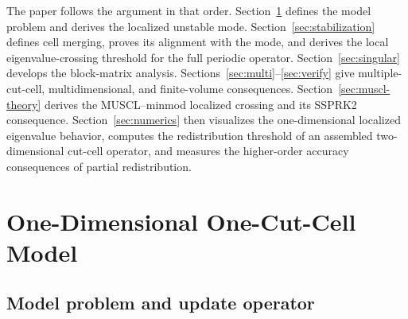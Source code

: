 \documentclass[preprint,12pt]{elsarticle}
\begin{document}
The paper follows the argument in that order.  Section~\ref{sec:1d} defines
the model problem and derives the localized unstable mode.
Section~\ref{sec:stabilization} defines cell merging, proves its alignment
with the mode, and derives the local eigenvalue-crossing threshold for the
full periodic operator.
Section~\ref{sec:singular} develops the block-matrix analysis.
Sections~\ref{sec:multi}--\ref{sec:verify} give multiple-cut-cell,
multidimensional, and finite-volume consequences.  Section~\ref{sec:muscl-theory}
derives the MUSCL--minmod localized crossing and its SSPRK2 consequence.
Section~\ref{sec:numerics} then visualizes the one-dimensional localized eigenvalue behavior, computes the redistribution threshold of an assembled two-dimensional cut-cell operator, and
measures the higher-order accuracy consequences of partial redistribution.

\section{One-Dimensional One-Cut-Cell Model}
\label{sec:1d}

\subsection{Model problem and update operator}
\end{document}
